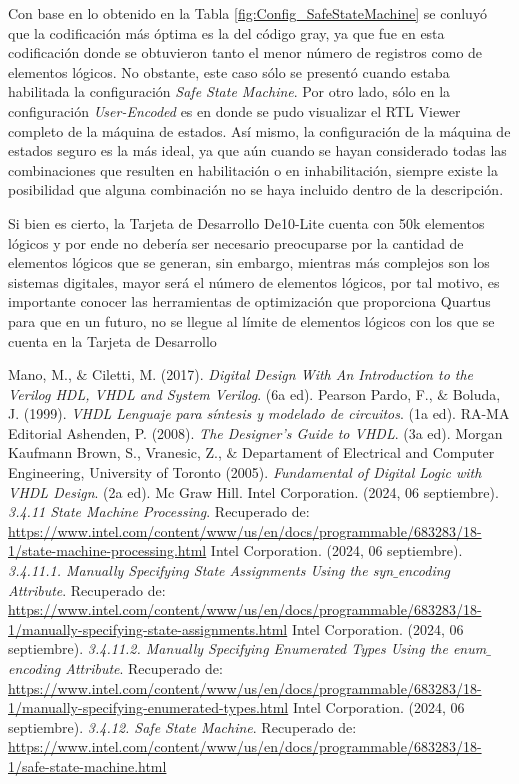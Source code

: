 \documentclass{article}
\begin{document}
Con base en lo obtenido en la Tabla \ref{fig:Config_SafeStateMachine} se conluyó que la codificación más óptima es la del código gray, ya que fue en esta codificación donde se obtuvieron tanto el menor número de registros como de elementos lógicos. No obstante, este caso sólo se presentó cuando estaba habilitada la configuración \textit{Safe State Machine}. Por otro lado, sólo en la configuración \textit{User-Encoded} es en donde se pudo visualizar el RTL Viewer completo de la máquina de estados. Así mismo, la configuración de la máquina de estados seguro es la más ideal, ya que aún cuando se hayan considerado todas las combinaciones que resulten en habilitación o en inhabilitación, siempre existe la posibilidad que alguna combinación no se haya incluido dentro de la descripción.

Si bien es cierto, la Tarjeta de Desarrollo De10-Lite cuenta con 50k elementos lógicos y por ende no debería ser necesario preocuparse por la cantidad de elementos lógicos que se generan, sin embargo, mientras más complejos son los sistemas digitales, mayor será el número de elementos lógicos, por tal motivo, es importante conocer las herramientas de optimización que proporciona Quartus para que en un futuro, no se llegue al límite de elementos lógicos con los que se cuenta en la Tarjeta de Desarrollo


\begin{thebibliography}{1}
 Mano, M., $\&$ Ciletti, M. (2017). \textit{Digital Design With An Introduction to the Verilog HDL, VHDL and System Verilog}. (6a ed). Pearson
 Pardo, F., $\&$ Boluda, J. (1999). \textit{VHDL Lenguaje para síntesis y modelado de circuitos}. (1a ed). RA-MA Editorial
 Ashenden, P. (2008). \textit{The Designer's Guide to VHDL}. (3a ed). Morgan Kaufmann
 Brown, S., Vranesic, Z., $\&$ Departament of Electrical and Computer Engineering, University of Toronto (2005). \textit{Fundamental of Digital Logic with VHDL Design}. (2a ed). Mc Graw Hill.
 Intel Corporation. (2024, 06 septiembre). \textit{3.4.11 State Machine Processing}. Recuperado de: \url{https://www.intel.com/content/www/us/en/docs/programmable/683283/18-1/state-machine-processing.html}
 Intel Corporation. (2024, 06 septiembre). \textit{3.4.11.1. Manually Specifying State Assignments Using the syn$\_$encoding Attribute}. Recuperado de: \url{https://www.intel.com/content/www/us/en/docs/programmable/683283/18-1/manually-specifying-state-assignments.html}
 Intel Corporation. (2024, 06 septiembre). \textit{3.4.11.2. Manually Specifying Enumerated Types Using the enum$\_$encoding Attribute}. Recuperado de: \url{https://www.intel.com/content/www/us/en/docs/programmable/683283/18-1/manually-specifying-enumerated-types.html}
 Intel Corporation. (2024, 06 septiembre). \textit{3.4.12. Safe State Machine}. Recuperado de: \url{https://www.intel.com/content/www/us/en/docs/programmable/683283/18-1/safe-state-machine.html}
\end{thebibliography}
\end{document}
